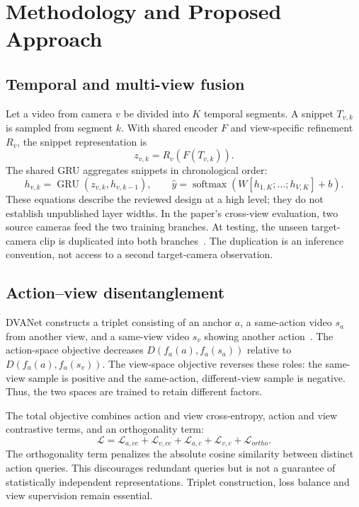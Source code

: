\documentclass[runningheads]{llncs}
\begin{document}
\section{Methodology and Proposed Approach}
\subsection{Temporal and multi-view fusion}
Let a video from camera $v$ be divided into $K$ temporal segments. A snippet $T_{v,k}$ is sampled from segment $k$. With shared encoder $F$ and view-specific refinement $R_v$, the snippet representation is
\begin{equation}
z_{v,k}=R_v(F(T_{v,k})).
\end{equation}
The shared GRU aggregates snippets in chronological order:
\begin{equation}
h_{v,k}=\operatorname{GRU}(z_{v,k},h_{v,k-1}),\qquad
\hat y=\operatorname{softmax}(W[h_{1,K};\ldots;h_{V,K}]+b).
\end{equation}
These equations describe the reviewed design at a high level; they do not establish unpublished layer widths. In the paper's cross-view evaluation, two source cameras feed the two training branches. At testing, the unseen target-camera clip is duplicated into both branches~\cite{bui}. The duplication is an inference convention, not access to a second target-camera observation.

\subsection{Action--view disentanglement}
DVANet constructs a triplet consisting of an anchor $a$, a same-action video $s_a$ from another view, and a same-view video $s_v$ showing another action~\cite{dva}. The action-space objective decreases $D(f_a(a),f_a(s_a))$ relative to $D(f_a(a),f_a(s_v))$. The view-space objective reverses these roles: the same-view sample is positive and the same-action, different-view sample is negative. Thus, the two spaces are trained to retain different factors.

The total objective combines action and view cross-entropy, action and view contrastive terms, and an orthogonality term:
\begin{equation}
\mathcal L=\mathcal L_{a,ce}+\mathcal L_{v,ce}+\mathcal L_{a,c}
+\mathcal L_{v,c}+\mathcal L_{ortho}.
\end{equation}
The orthogonality term penalizes the absolute cosine similarity between distinct action queries. This discourages redundant queries but is not a guarantee of statistically independent representations. Triplet construction, loss balance and view supervision remain essential.
\end{document}
